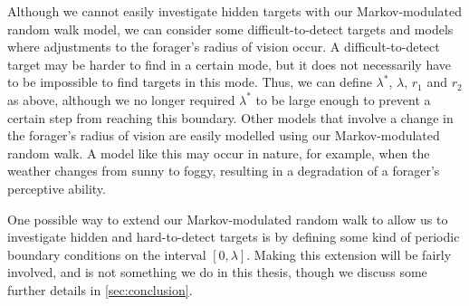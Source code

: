 Although we cannot easily investigate hidden targets with our Markov-modulated random walk model, we can consider some difficult-to-detect targets and models where adjustments to the forager's radius of vision occur. A difficult-to-detect target may be harder to find in a certain mode, but it does not necessarily have to be impossible to find targets in this mode. Thus, we can define $\lambda^*$, $\lambda$, $r_1$ and $r_2$ as above, although we no longer required $\lambda^*$ to be large enough to prevent a certain step from reaching this boundary. Other models that involve a change in the forager's radius of vision are easily modelled using our Markov-modulated random walk. A model like this may occur in nature, for example, when the weather changes from sunny to foggy, resulting in a degradation of a forager's perceptive ability. 

One possible way to extend our Markov-modulated random walk to allow us to investigate hidden and hard-to-detect targets is by defining some kind of periodic boundary conditions on the interval $[0,\lambda]$. Making this extension will be fairly involved, and is not something we do in this thesis, though we discuss some further details in \cref{sec:conclusion}. 


